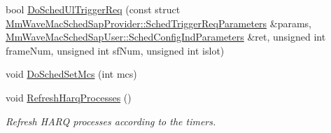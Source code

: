 \begin{DoxyCompactItemize}
\item 
bool \hyperlink{classns3_1_1MmWaveFlexTtiMacScheduler_a6c4a0a7211bb9b02115beb205bd194ac}{Do\+Sched\+Ul\+Trigger\+Req} (const struct \hyperlink{structns3_1_1MmWaveMacSchedSapProvider_1_1SchedTriggerReqParameters}{Mm\+Wave\+Mac\+Sched\+Sap\+Provider\+::\+Sched\+Trigger\+Req\+Parameters} \&params, \hyperlink{structns3_1_1MmWaveMacSchedSapUser_1_1SchedConfigIndParameters}{Mm\+Wave\+Mac\+Sched\+Sap\+User\+::\+Sched\+Config\+Ind\+Parameters} \&ret, unsigned int frame\+Num, unsigned int sf\+Num, unsigned int islot)
\item 
void \hyperlink{classns3_1_1MmWaveFlexTtiMacScheduler_abd090b870575d88da6c2d839c3101c84}{Do\+Sched\+Set\+Mcs} (int mcs)
\item 
void \hyperlink{classns3_1_1MmWaveFlexTtiMacScheduler_a281920e70bec00820617efef009a83fd}{Refresh\+Harq\+Processes} ()
\begin{DoxyCompactList}\small\item\em Refresh H\+A\+RQ processes according to the timers. \end{DoxyCompactList}\end{DoxyCompactItemize}
